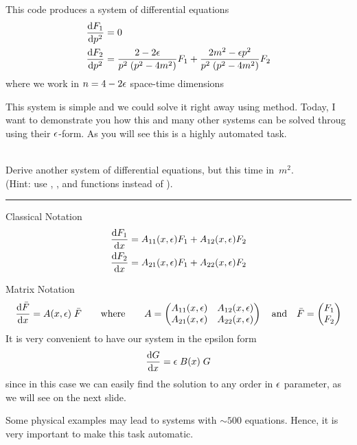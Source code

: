 \documentclass[11pt]{article}
\newcommand{\titleb}[2]{{\color{Blue}{\LARGE #1}\hfill{\Large #2}\vspace{-2mm}\par\rule{\textwidth}{1pt}\vs}}
\newcommand{\titlea}[1]{\titleb{#1}{}}
\begin{document}
\bi
  \item This code produces a system of differential equations
  $$
    \begin{aligned}
     \frac{\mathrm{d} F_1}{\mathrm{d} p^2} & = 0
     \\
     \frac{\mathrm{d} F_2}{\mathrm{d} p^2} & = \frac{2-2\epsilon}{p^2\;(p^2-4m^2)} F_1 + \frac{2m^2-\epsilon p^2}{p^2\;(p^2-4m^2)} F_2
    \end{aligned}
  $$
  where we work in $n=4-2\epsilon$ space-time dimensions
\ei
\vs

This system is simple and we could solve it right away using {\em <your favourite>} method.
Today, I want to demonstrate you how this and many other systems can be solved throug using their $\epsilon$-form.
As you will see this is a highly automated task.

\vs
{} \\
Derive another system of differential equations, but this time in~$m^2$.\\
(Hint: use , , and  functions instead of ).
\newpage


\titlea{Epsilon Form}
\bi
  \item Classical Notation
$$
\begin{aligned}
 \frac{\mathrm{d} F_1}{\mathrm{d} x} & = A_{11}(x,\epsilon) F_1 + A_{12}(x,\epsilon) F_2
 \\
 \frac{\mathrm{d} F_2}{\mathrm{d} x} & = A_{21}(x,\epsilon) F_1 + A_{22}(x,\epsilon) F_2
\end{aligned}
$$
  \item Matrix Notation
$$
\frac{\mathrm{d} \bar{F}}{\mathrm{d} x} = A(x,\epsilon) \; \bar{F}
\qquad \text{where}\qquad
A=
\begin{pmatrix}
  A_{11}(x,\epsilon) & A_{12}(x,\epsilon) \\
  A_{21}(x,\epsilon) & A_{22}(x,\epsilon)
 \end{pmatrix}
\quad \text{and}\quad
\bar{F}=
\begin{pmatrix}
  F_1 \\
  F_2
 \end{pmatrix}
$$
\ei
It is very convenient to have our system in the epsilon form
$$
\frac{\mathrm{d} G}{\mathrm{d} x} = \epsilon \; B(x) \; G
$$%
since in this case we can easily find the solution to any order in $\epsilon$ parameter, as we will see on the next slide.

Some physical examples may lead to systems with $\sim 500$ equations.
Hence, it is very important to make this task automatic.
\newpage
\end{document}
